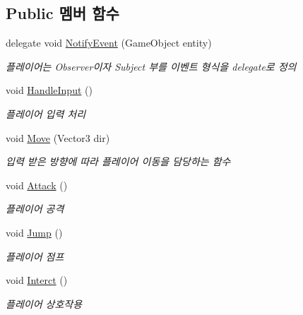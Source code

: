 \subsection*{Public 멤버 함수}
\begin{DoxyCompactItemize}
\item 
delegate void \mbox{\hyperlink{class_player_controller_a934c7f80b80276620cd60eaaeea7520e}{Notify\+Event}} (Game\+Object entity)
\begin{DoxyCompactList}\small\item\em 플레이어는 Observer이자 Subject 부를 이벤트 형식을 delegate로 정의 \end{DoxyCompactList}\item 
void \mbox{\hyperlink{class_player_controller_a5ebfe098b2dc258ca8349e6951766883}{Handle\+Input}} ()
\begin{DoxyCompactList}\small\item\em 플레이어 입력 처리 \end{DoxyCompactList}\item 
void \mbox{\hyperlink{class_player_controller_a79dff0e97fa69f5f3660d65c2a32be39}{Move}} (Vector3 dir)
\begin{DoxyCompactList}\small\item\em 입력 받은 방향에 따라 플레이어 이동을 담당하는 함수 \end{DoxyCompactList}\item 
void \mbox{\hyperlink{class_player_controller_a473a610cfe2a374d5cb39b3c44881d11}{Attack}} ()
\begin{DoxyCompactList}\small\item\em 플레이어 공격 \end{DoxyCompactList}\item 
void \mbox{\hyperlink{class_player_controller_a8a7010cb6f3c524737be3f6f77553df9}{Jump}} ()
\begin{DoxyCompactList}\small\item\em 플레이어 점프 \end{DoxyCompactList}\item 
void \mbox{\hyperlink{class_player_controller_ad27e790d9d27a02b497c41f668f1dc25}{Interct}} ()
\begin{DoxyCompactList}\small\item\em 플레이어 상호작용 \end{DoxyCompactList}\end{DoxyCompactItemize}

